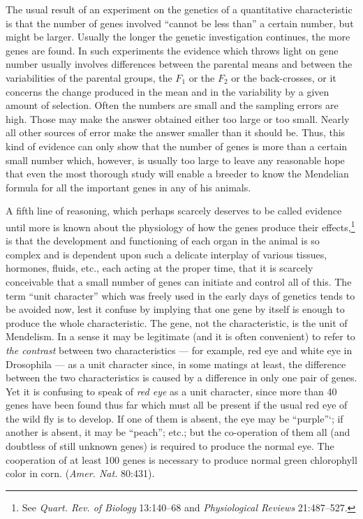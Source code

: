 The usual result of an experiment on the genetics of a quantitative
characteristic is that the number of genes involved ``cannot be less
than'' a certain number, but might be larger. Usually the longer the
genetic investigation continues, the more genes are found. In such
experiments the evidence which throws light on gene number usually
involves differences between the parental means and between the variabilities
of the parental groups, the $F_1$ or the $F_2$ or the back-crosses, or it
concerns the change produced in the mean and in the variability by a
given amount of selection. Often the numbers are small and the sampling
errors are high. Those may make the answer obtained either too
large or too small. Nearly all other sources of error make the answer
smaller than it should be. Thus, this kind of evidence can only show
that the number of genes is more than a certain small number which,
however, is usually too large to leave any reasonable hope that even the
most thorough study will enable a breeder to know the Mendelian
formula for all the important genes in any of his animals.

A fifth line of reasoning, which perhaps scarcely deserves to be called
evidence until more is known about the physiology of how the genes
produce their effects,\footnote{See \textit{Quart. Rev. of Biology}
13:140--68 and \textit{Physiological Reviews} 21:487--527.} is that the
development and functioning of each
organ in the animal is so complex and is dependent upon such a delicate
interplay of various tissues, hormones, fluids, etc., each acting at
the proper time, that it is scarcely conceivable that a small number of
genes can initiate and control all of this. The term ``unit character''
which was freely used in the early days of genetics tends to be avoided
now, lest it confuse by implying that one gene by itself is enough to produce
the whole characteristic. The gene, not the characteristic, is the
unit of Mendelism. In a sense it may be legitimate (and it is often convenient)
to refer to \textit{the contrast} between two characteristics --- for example,
red eye and white eye in Drosophila --- as a unit character since, in
some matings at least, the difference between the two characteristics is
caused by a difference in only one pair of genes. Yet it is confusing to
speak of \textit{red eye} as a unit character, since more than 40 genes have been
found thus far which must all be present if the usual red eye of the wild
fly is to develop. If one of them is absent, the eye may be ``purple''`; if
another is absent, it may be ``peach''; etc.; but the co-operation of them
all (and doubtless of still unknown genes) is required to produce the
normal eye. The cooperation of at least 100 genes is necessary to
produce normal green chlorophyll color in corn. (\textit{Amer. Nat.} 80:431).

